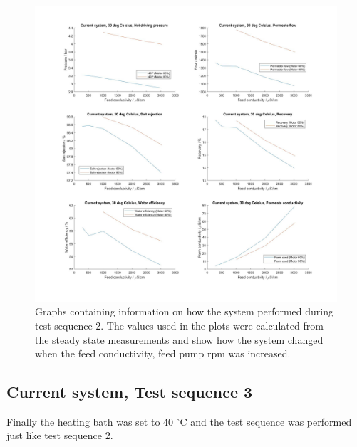 \begin{figure}[H]
    \centering
    \includegraphics[width=1.1\textwidth]{Key30}
    \caption{Graphs containing information on how the system performed during test sequence 2. The values used in the plots were calculated from the steady state measurements and show how the system changed when the feed conductivity, feed pump rpm was increased.}
    \label{fig:K30}
\end{figure}

\newpage

\subsection{Current system, Test sequence 3}

Finally the heating bath was set to 40 $^{\circ}$C and the test sequence was performed just like test sequence 2. 

